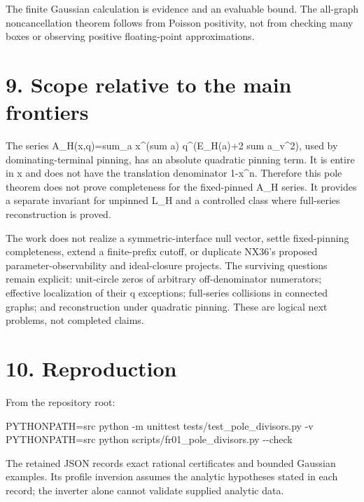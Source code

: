 \documentclass[
  11pt,
  a4paper,
]{report}
\newenvironment{Shaded}{}{}
\newcommand{\AttributeTok}[1]{\textcolor[rgb]{0.49,0.56,0.16}{#1}}
\newcommand{\ExtensionTok}[1]{#1}
\newcommand{\NormalTok}[1]{#1}
\newcommand{\OperatorTok}[1]{\textcolor[rgb]{0.40,0.40,0.40}{#1}}
\newcommand{\VariableTok}[1]{\textcolor[rgb]{0.10,0.09,0.49}{#1}}
\begin{document}
The finite Gaussian calculation is evidence and an evaluable bound. The
all-graph noncancellation theorem follows from Poisson positivity, not
from checking many boxes or observing positive floating-point
approximations.

\hypertarget{scope-relative-to-the-main-frontiers}{%
\section{9. Scope relative to the main
frontiers}\label{scope-relative-to-the-main-frontiers}}

The series A\_H(x,q)=sum\_a x\^{}(sum a) q\^{}(E\_H(a)+2 sum a\_v\^{}2),
used by dominating-terminal pinning, has an absolute quadratic pinning
term. It is entire in x and does not have the translation denominator
1-x\^{}n. Therefore this pole theorem does not prove completeness for
the fixed-pinned A\_H series. It provides a separate invariant for
unpinned L\_H and a controlled class where full-series reconstruction is
proved.

The work does not realize a symmetric-interface null vector, settle
fixed-pinning completeness, extend a finite-prefix cutoff, or duplicate
NX36's proposed parameter-observability and ideal-closure projects. The
surviving questions remain explicit: unit-circle zeros of arbitrary
off-denominator numerators; effective localization of their q
exceptions; full-series collisions in connected graphs; and
reconstruction under quadratic pinning. These are logical next problems,
not completed claims.

\hypertarget{reproduction}{%
\section{10. Reproduction}\label{reproduction}}

From the repository root:

\begin{Shaded}
\begin{Highlighting}[]
\VariableTok{PYTHONPATH}\OperatorTok{=}\NormalTok{src }\ExtensionTok{python} \AttributeTok{{-}m}\NormalTok{ unittest tests/test\_pole\_divisors.py }\AttributeTok{{-}v}
\VariableTok{PYTHONPATH}\OperatorTok{=}\NormalTok{src }\ExtensionTok{python}\NormalTok{ scripts/fr01\_pole\_divisors.py }\AttributeTok{{-}{-}check}
\end{Highlighting}
\end{Shaded}

The retained JSON records exact rational certificates and bounded
Gaussian examples. Its profile inversion assumes the analytic hypotheses
stated in each record; the inverter alone cannot validate supplied
analytic data.
\end{document}
